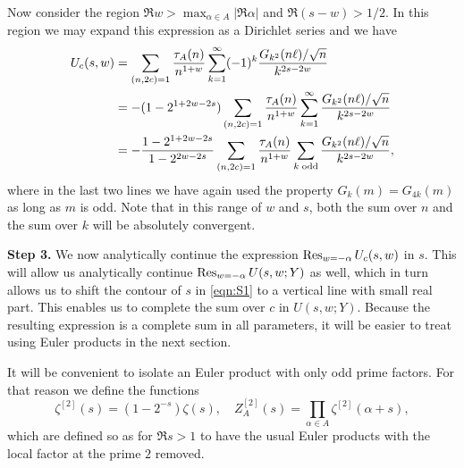 \documentclass[12pt]{amsart}
\begin{document}
	Now consider the region $\Re w > \max_{\alpha \in A} |\Re \alpha|$ and $\Re (s-w) > 1/2$. In this region we may expand this expression as a Dirichlet series and we have
	\begin{align} 
		\label{eqn:euler2}
		\notag U_c(s,w) &= \sum_{(n,2c)=1} \frac{\tau_A(n)}{n^{1+w}}   
		\sum_{k=1}^\infty  (-1)^k \frac{G_{k^2}(n\ell) /\sqrt{n}}{k^{2s-2w}}\\
		\notag  &   = -(1-2^{1+2w-2s}) \sum_{(n,2c)=1} \frac{\tau_A(n)}{n^{1+w}} 
		\sum_{k=1}^\infty   \frac{G_{k^2}(n\ell) /\sqrt{n}}{k^{2s-2w}} \\
		&= - \frac{1-2^{1+2w-2s}}{1-2^{2w-2s}} \sum_{(n,2c)=1} \frac{\tau_A(n)}{n^{1+w}} 
		\sum_{k \; \mathrm{odd}}  \frac{G_{k^2}(n\ell) /\sqrt{n}}{k^{2s-2w}},
	\end{align}
	where in the last two lines we have again used the property $G_k(m)=G_{4k}(m)$ as long as $m$ is odd. Note that in this range of $w$ and $s$, both the sum over $n$ and the sum over $k$ will be absolutely convergent.  
	
	\textbf{Step 3.} We now analytically continue the expression $\operatornamewithlimits{Res}_{w = -\alpha} U_c(s,w)$ in $s$. This will allow us analytically continue $\operatornamewithlimits{Res}_{w = -\alpha} U(s,w;Y)$ as well, which in turn allows us to shift the contour of $s$ in \eqref{eqn:S1} to a vertical line with small real part. This enables us to complete the sum over $c$ in $U(s,w;Y)$. Because the resulting expression is a complete sum in all parameters, it will be easier to treat using Euler products in the next section.
	
	It will be convenient to isolate an Euler product with only odd prime factors. For that reason we define the functions
	\begin{equation}
		\label{eq:odd_zeta}
		\zeta^{[2]}(s) = (1-2^{-s})\zeta(s), \quad Z^{[2]}_A(s) = \prod_{\alpha \in A} \zeta^{[2]}(\alpha+s),
	\end{equation}
	which are defined so as for $\Re s > 1$ to have the usual Euler products with the local factor at the prime $2$ removed.
	
\end{document}
